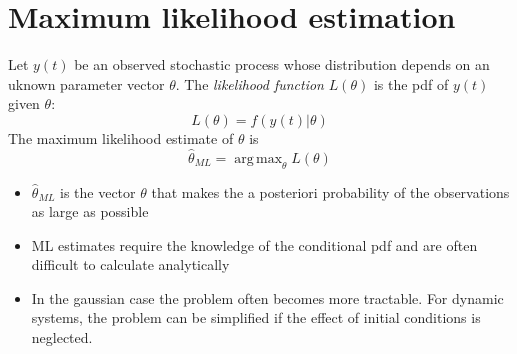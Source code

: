 \documentclass{book}
\DeclareMathOperator*{\argmax}{arg\,max}
\begin{document}
\chapter{Maximum likelihood estimation}

Let $y(t)$ be an observed stochastic process whose distribution depends on an uknown parameter vector $\theta$. The \emph{likelihood function} $L(\theta)$ is the pdf of $y(t)$ given $\theta$: 
\[
    L(\theta)=f(y(t)|\theta)
\]
The maximum likelihood estimate of $\theta$ is 
\[
    \hat{\theta}_{ML}=\argmax_\theta L(\theta)
\]
\begin{itemize}
    \item $\hat{\theta}_{ML}$ is the vector $\theta$ that makes the a posteriori probability of the observations as large as possible 
    \item ML estimates require the knowledge of the conditional pdf and are often difficult to calculate analytically
    \item In the gaussian case the problem often becomes more tractable. For dynamic systems, the problem can be simplified if the effect of initial conditions is neglected.
\end{itemize}
\end{document}
